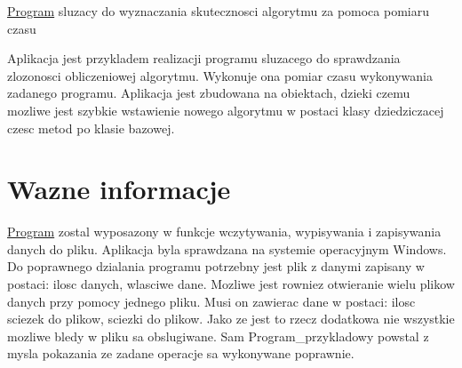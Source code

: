 \hyperlink{class_program}{Program} sluzacy do wyznaczania skutecznosci algorytmu za pomoca pomiaru czasu

Aplikacja jest przykladem realizacji programu sluzacego do sprawdzania zlozonosci obliczeniowej algorytmu. Wykonuje ona pomiar czasu wykonywania zadanego programu. Aplikacja jest zbudowana na obiektach, dzieki czemu mozliwe jest szybkie wstawienie nowego algorytmu w postaci klasy dziedziczacej czesc metod po klasie bazowej.\hypertarget{index_etykieta-wazne-informacje}{}\section{Wazne informacje}\label{index_etykieta-wazne-informacje}
\hyperlink{class_program}{Program} zostal wyposazony w funkcje wczytywania, wypisywania i zapisywania danych do pliku. Aplikacja byla sprawdzana na systemie operacyjnym Windows. Do poprawnego dzialania programu potrzebny jest plik z danymi zapisany w postaci\-: ilosc danych, wlasciwe dane. Mozliwe jest rowniez otwieranie wielu plikow danych przy pomocy jednego pliku. Musi on zawierac dane w postaci\-: ilosc sciezek do plikow, sciezki do plikow. Jako ze jest to rzecz dodatkowa nie wszystkie mozliwe bledy w pliku sa obslugiwane. Sam Program\-\_\-przykladowy powstal z mysla pokazania ze zadane operacje sa wykonywane poprawnie. 